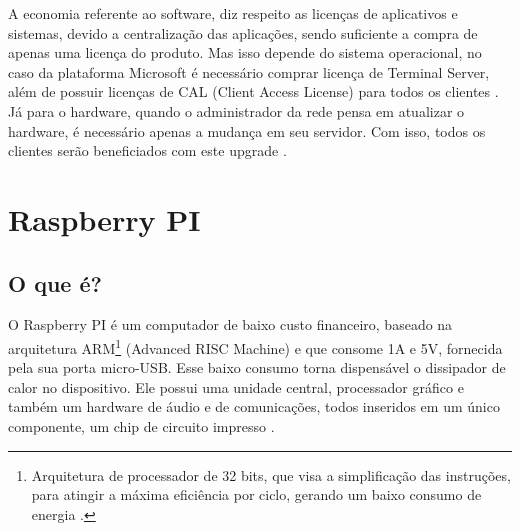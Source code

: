\documentclass[
	12pt,				%
	openright,			%
	twoside,			%
	a4paper,			%
	chapter=TITLE,		%
	english,			%
	brazil				%
	]{abntex2}
\begin{document}
A economia referente ao software, diz respeito as licenças de aplicativos e sistemas, devido a centralização das aplicações, sendo suficiente a compra de apenas uma licença do produto. Mas isso depende do sistema operacional, no caso da plataforma Microsoft é necessário comprar licença de Terminal Server, além de possuir licenças de CAL (Client Access License) para todos os clientes \cite{microsoft}. Já para o hardware, quando o administrador da rede pensa em atualizar o hardware, é necessário apenas a mudança em seu servidor. Com isso, todos os clientes serão beneficiados com este upgrade \cite{EmailThinClient}.


\begin{table}[h!]
\end{table}

\newpage



\chapter{Raspberry PI}
\label{refe:raspberry}

\section{O que é?}


O Raspberry PI é um computador de baixo custo financeiro, baseado na arquitetura ARM\footnote{Arquitetura de processador de 32 bits, que visa a simplificação das instruções, para atingir a máxima eficiência por ciclo, gerando um baixo consumo de energia \cite{arm}.} (Advanced RISC Machine) e que consome 1A e 5V, fornecida pela sua porta micro-USB. Esse baixo consumo torna dispensável o dissipador de calor no dispositivo. Ele possui uma unidade central, processador gráfico e também um hardware de áudio e de comunicações, todos inseridos em um único componente, um chip de circuito impresso \cite{eben2013raspberry, raspberrypi.org}.
\end{document}
